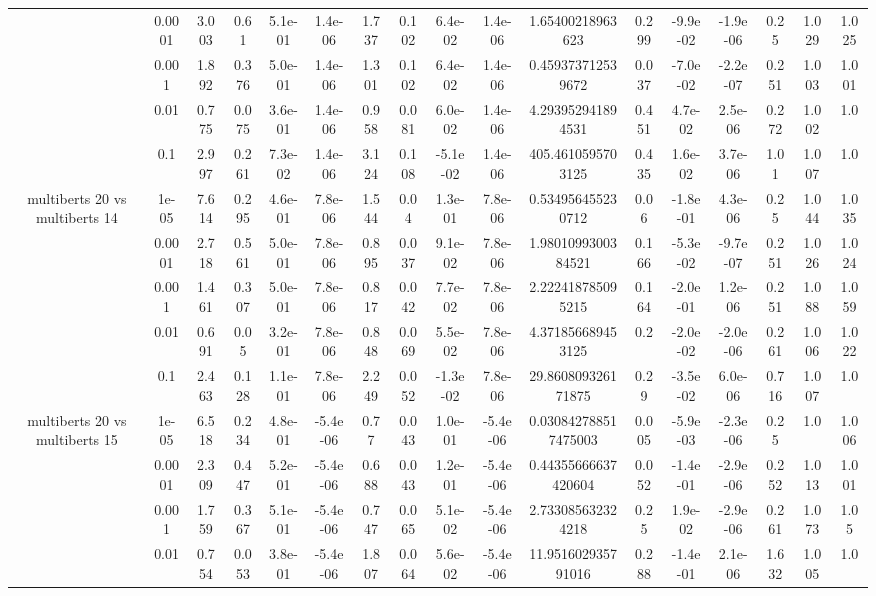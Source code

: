 \begin{tabular}{|c|c|c|c|c|c|c|c|c|c|c|c|c|c|c|c|c|}
 & 0.0001 & 3.003 & 0.61 & 5.1e-01 & 1.4e-06 & 1.737 & 0.102 & 6.4e-02 & 1.4e-06 & 1.65400218963623 & 0.299 & -9.9e-02 & -1.9e-06 & 0.25 & 1.029 & 1.025 \\
 & 0.001 & 1.892 & 0.376 & 5.0e-01 & 1.4e-06 & 1.301 & 0.102 & 6.4e-02 & 1.4e-06 & 0.459373712539672 & 0.037 & -7.0e-02 & -2.2e-07 & 0.251 & 1.003 & 1.001 \\
 & 0.01 & 0.775 & 0.075 & 3.6e-01 & 1.4e-06 & 0.958 & 0.081 & 6.0e-02 & 1.4e-06 & 4.293952941894531 & 0.451 & 4.7e-02 & 2.5e-06 & 0.272 & 1.002 & 1.0 \\
 & 0.1 & 2.997 & 0.261 & 7.3e-02 & 1.4e-06 & 3.124 & 0.108 & -5.1e-02 & 1.4e-06 & 405.4610595703125 & 0.435 & 1.6e-02 & 3.7e-06 & 1.01 & 1.007 & 1.0 \\
\hline
\multirow{5}{*}{multiberts 20 vs multiberts 14} & 1e-05 & 7.614 & 0.295 & 4.6e-01 & 7.8e-06 & 1.544 & 0.04 & 1.3e-01 & 7.8e-06 & 0.534956455230712 & 0.06 & -1.8e-01 & 4.3e-06 & 0.25 & 1.044 & 1.035 \\
 & 0.0001 & 2.718 & 0.561 & 5.0e-01 & 7.8e-06 & 0.895 & 0.037 & 9.1e-02 & 7.8e-06 & 1.9801099300384521 & 0.166 & -5.3e-02 & -9.7e-07 & 0.251 & 1.026 & 1.024 \\
 & 0.001 & 1.461 & 0.307 & 5.0e-01 & 7.8e-06 & 0.817 & 0.042 & 7.7e-02 & 7.8e-06 & 2.222418785095215 & 0.164 & -2.0e-01 & 1.2e-06 & 0.251 & 1.088 & 1.059 \\
 & 0.01 & 0.691 & 0.05 & 3.2e-01 & 7.8e-06 & 0.848 & 0.069 & 5.5e-02 & 7.8e-06 & 4.371856689453125 & 0.2 & -2.0e-02 & -2.0e-06 & 0.261 & 1.006 & 1.022 \\
 & 0.1 & 2.463 & 0.128 & 1.1e-01 & 7.8e-06 & 2.249 & 0.052 & -1.3e-02 & 7.8e-06 & 29.860809326171875 & 0.29 & -3.5e-02 & 6.0e-06 & 0.716 & 1.007 & 1.0 \\
\hline
\multirow{5}{*}{multiberts 20 vs multiberts 15} & 1e-05 & 6.518 & 0.234 & 4.8e-01 & -5.4e-06 & 0.77 & 0.043 & 1.0e-01 & -5.4e-06 & 0.030842788517475003 & 0.005 & -5.9e-03 & -2.3e-06 & 0.25 & 1.0 & 1.006 \\
 & 0.0001 & 2.309 & 0.447 & 5.2e-01 & -5.4e-06 & 0.688 & 0.043 & 1.2e-01 & -5.4e-06 & 0.44355666637420604 & 0.052 & -1.4e-01 & -2.9e-06 & 0.252 & 1.013 & 1.001 \\
 & 0.001 & 1.759 & 0.367 & 5.1e-01 & -5.4e-06 & 0.747 & 0.065 & 5.1e-02 & -5.4e-06 & 2.733085632324218 & 0.25 & 1.9e-02 & -2.9e-06 & 0.261 & 1.073 & 1.05 \\
 & 0.01 & 0.754 & 0.053 & 3.8e-01 & -5.4e-06 & 1.807 & 0.064 & 5.6e-02 & -5.4e-06 & 11.951602935791016 & 0.288 & -1.4e-01 & 2.1e-06 & 1.632 & 1.005 & 1.0 \\

\end{tabular}
